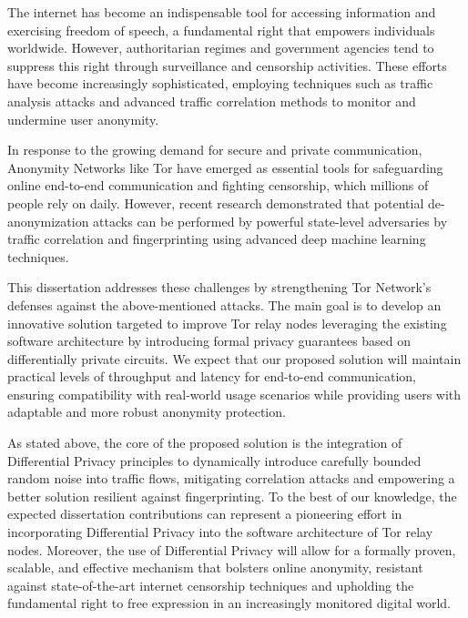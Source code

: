 
%

The internet has become an indispensable tool for accessing information and exercising freedom of speech, a fundamental right that empowers individuals worldwide. However, authoritarian regimes and government agencies tend to suppress this right through surveillance and censorship activities. These efforts have become increasingly sophisticated, employing techniques such as traffic analysis attacks and advanced traffic correlation methods to monitor and undermine user anonymity.

In response to the growing demand for secure and private communication, Anonymity Networks like Tor have emerged as essential tools for safeguarding online end-to-end communication and fighting censorship, which millions of people rely on daily. However, recent research demonstrated that potential de-anonymization attacks can be performed by powerful state-level adversaries by traffic correlation and fingerprinting using advanced deep machine learning techniques.

This dissertation addresses these challenges by strengthening Tor Network's defenses against the above-mentioned attacks. The main goal is to develop an innovative solution targeted to improve Tor relay nodes leveraging the existing software architecture by introducing formal privacy guarantees based on differentially private circuits. We expect that our proposed solution will maintain practical levels of throughput and latency for end-to-end communication, ensuring compatibility with real-world usage scenarios while providing users with adaptable and more robust anonymity protection.

As stated above, the core of the proposed solution is the integration of Differential Privacy principles to dynamically introduce carefully bounded random noise into traffic flows, mitigating correlation attacks and empowering a better solution resilient against fingerprinting. 
To the best of our knowledge, the expected dissertation contributions can represent a pioneering effort in incorporating Differential
Privacy into the software architecture of Tor relay nodes. Moreover, the use of Differential Privacy will allow for a formally proven, scalable, and effective mechanism that bolsters online anonymity, resistant against state-of-the-art internet censorship techniques and upholding the fundamental right to free expression in an increasingly monitored digital world.

